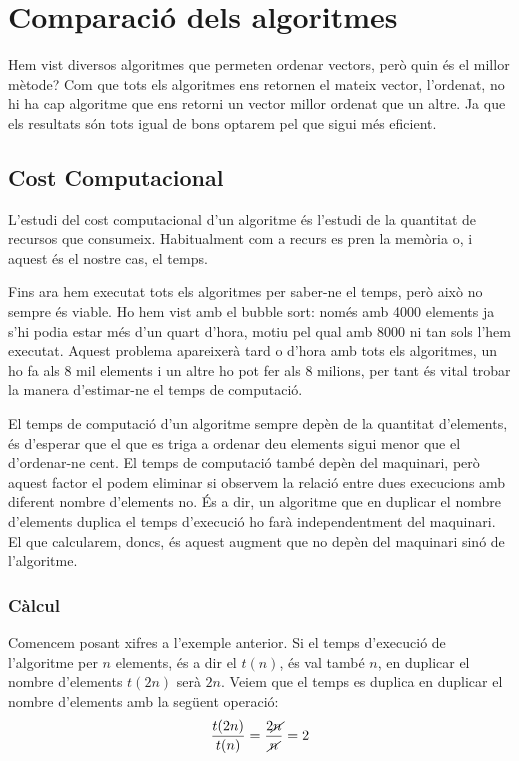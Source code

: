 \chapter{Comparació dels algoritmes}
Hem vist diversos algoritmes que permeten ordenar vectors, però quin és el millor mètode?
Com que tots els algoritmes ens retornen el mateix vector, l'ordenat, no hi ha cap algoritme que ens retorni un vector millor ordenat que un altre. Ja que els resultats són tots igual de bons optarem pel que sigui més eficient.

\section{Cost Computacional}
L'estudi del cost computacional d'un algoritme és l'estudi de la quantitat de recursos que consumeix. Habitualment com a recurs es pren la memòria o, i aquest és el nostre cas, el temps.

Fins ara hem executat tots els algoritmes per saber-ne el temps, però això no sempre és viable.
Ho hem vist amb el bubble sort: només amb 4000 elements ja s'hi podia estar més d'un quart d'hora, motiu pel qual amb 8000 ni tan sols l'hem executat.
Aquest problema apareixerà tard o d'hora amb tots els algoritmes, un ho fa als 8 mil elements i un altre ho pot fer als 8 milions, per tant és vital trobar la manera d'estimar-ne el temps de computació.

El temps de computació d'un algoritme sempre depèn de la quantitat d'elements, és d'esperar que el que es triga a ordenar deu elements sigui menor que el d'ordenar-ne cent.
El temps de computació també depèn del maquinari, però aquest factor el podem eliminar si observem la relació entre dues execucions amb diferent nombre d'elements no.
És a dir, un algoritme que en duplicar el nombre d'elements duplica el temps d'execució ho farà independentment del maquinari.
El que calcularem, doncs, és aquest augment que no depèn del maquinari sinó de l'algoritme.

\subsection{Càlcul}
Comencem posant xifres a l'exemple anterior.
Si el temps d'execució de l'algoritme per $n$ elements, és a dir el $t(n)$, és val també $n$, en duplicar el nombre d'elements $t(2n)$ serà $2n$.
Veiem que el temps es duplica en duplicar el nombre d'elements amb la següent operació:
\begin{gather*}
	\frac{t(2n)}{t(n)} = \frac{2 \cancel{n}}{ \cancel{n}} = 2
\end{gather*}

